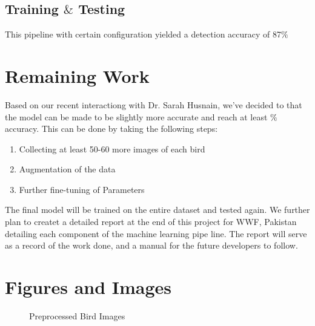 \documentclass{article}
\begin{document}
    \subsection*{Training $\&$ Testing}
    
    This pipeline with certain configuration yielded a detection accuracy of 87$\%$


    \section*{Remaining Work}
    
    Based on our recent interactiong with Dr. Sarah Husnain, we've decided to that the model can be made to be slightly more accurate and reach at least $\%$ accuracy. This can be done by taking the following steps:
    \begin{enumerate}
        \item Collecting at least 50-60 more images of each bird
        \item Augmentation of the data
        \item Further fine-tuning of Parameters
    \end{enumerate}
    The final model will be trained on the entire dataset and tested again. We further plan to createt a detailed report at the end of this project for WWF, Pakistan detailing each component of the machine learning pipe line. The report will serve as a record of the work done, and a manual for the future developers to follow.
    
    \section*{Figures and Images}
        \begin{figure}[h!]
        \centering
        \caption{Preprocessed Bird Images}
        \label{Birds}
    \end{figure}
   
        
        
\end{document}
